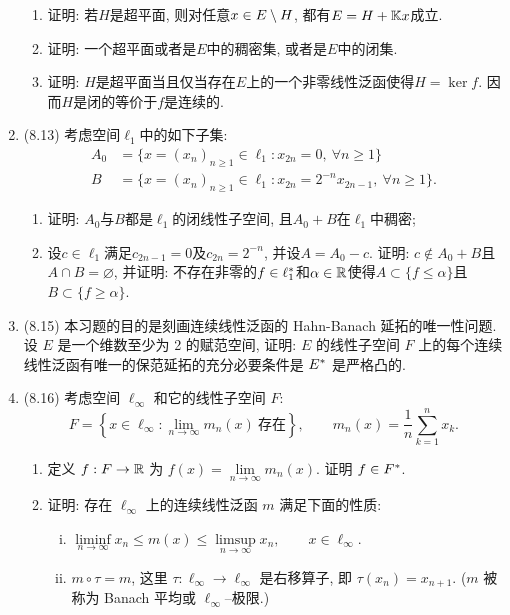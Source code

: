 \begin{enumerate}[label=\textbf{\arabic*.}, ref=\arabic*]
\begin{enumerate}[(1)]
			\item 证明: 若$ H $是超平面, 则对任意$ x\in E\setminus H $, 都有$ E=H+\mathbb{K} x $成立.
			\item 证明: 一个超平面或者是$ E $中的稠密集, 或者是$ E $中的闭集.
			\item 证明: $ H $是超平面当且仅当存在$ E $上的一个非零线性泛函使得$ H=\ker f $. 因而$ H $是闭的等价于$ f $是连续的.
			\end{enumerate}
		\item (8.13) 考虑空间$ \ell_1 $中的如下子集:
			\[
			\begin{aligned}
			A_0&=\{ x=(x_n)_{n\geqslant 1}\in\ell_1 : x_{2n}=0,\ \forall n\geqslant 1 \}\\
			B&=\{ x=(x_n)_{n\geqslant 1}\in\ell_1 : x_{2n}=2^{-n}x_{2n-1},\ \forall n\geqslant 1 \}.
			\end{aligned}
			\]
			\begin{enumerate}[(1)]
			\item 证明: $ A_0 $与$ B $都是$ \ell_1 $的闭线性子空间, 且$ A_0+B $在$\ell_1 $中稠密;
			\item 设$ c\in\ell_1 $满足$ c_{2n-1}=0 $及$ c_{2n}=2^{-n} $, 并设$ A=A_0-c $. 证明: $ c\notin A_0+B $且$ A\cap B=\varnothing $, 并证明: 不存在非零的$ f\in\ell_1^{*} $和$ \alpha\in\mathbb{R} $使得$ A\subset\{ f\leqslant\alpha \} $且$ B\subset\{ f\geqslant\alpha \} $.
			\end{enumerate}
		\item (8.15) 本习题的目的是刻画连续线性泛函的 Hahn-Banach 延拓的唯一性问题. 设 $ E $ 是一个维数至少为 2 的赋范空间, 证明: $ E $ 的线性子空间 $ F $ 上的每个连续线性泛函有唯一的保范延拓的充分必要条件是 $ E^{*} $ 是严格凸的.
		\item (8.16) 考虑空间 $ \ell_{\infty} $ 和它的线性子空间 $ F $:
			\[
				F = \left\{ x\in\ell_{\infty}:\lim_{n\to\infty} m_{n}(x)\ \text{存在} \right\}, \qquad m_{n}(x)=\frac{1}{n}\sum_{k=1}^{n} x_{k}.
			\]
			\begin{enumerate}[(1)]
				\item 定义 $ f:F\to\mathbb{R} $ 为 $ f(x)=\lim\limits_{n\to\infty}m_{n}(x) $. 证明 $ f\in F^{*} $.
				\item 证明: 存在 $ \ell_{\infty} $ 上的连续线性泛函 $ m $ 满足下面的性质:
				\begin{enumerate}[(i)]
					\item $ \liminf\limits_{n\to\infty}x_{n}\leqslant m(x)\leqslant\limsup\limits_{n\to\infty}x_{n}, \qquad x\in\ell_{\infty} $.
					\item $ m\circ \tau=m $, 这里 $ \tau: \ell_{\infty}\to\ell_{\infty} $ 是右移算子, 即 $ \tau(x_{n})=x_{n+1} $. ($ m $ 被称为 Banach 平均或 $ \ell_{\infty} $--极限.)

\end{enumerate}
\end{enumerate}
\end{enumerate}
